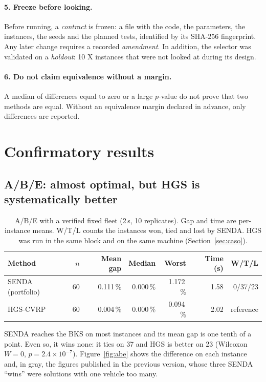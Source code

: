 \documentclass[11pt,a4paper]{article}
\newcommand{\senda}{SENDA}
\begin{document}
\paragraph{5. Freeze before looking.} Before running, a \emph{contract} is frozen: a file with the
code, the parameters, the instances, the seeds and the planned tests, identified by its SHA-256
fingerprint. Any later change requires a recorded \emph{amendment}. In addition, the selector was
validated on a \emph{holdout}: 10 X instances that were not looked at during its design.

\paragraph{6. Do not claim equivalence without a margin.} A median of differences equal to zero or a
large $p$-value do not prove that two methods are equal. Without an equivalence margin declared in
advance, only differences are reported.

\section{Confirmatory results}
\label{sec:resultados}

\subsection{A/B/E: almost optimal, but HGS is systematically better}

\begin{table}[H]
\centering
\caption{A/B/E with a verified fixed fleet (2\,s, 10 replicates). Gap and time are per-instance
means. W/T/L counts the instances won, tied and lost by SENDA. HGS was run in the same block and on
the same machine (Section~\ref{sec:caso}).}
\label{tab:abe}
\small
\begin{tabular}{@{}lrrrrrr@{}}
\toprule
Method & $n$ & Mean gap & Median & Worst & Time (s) & W/T/L \\
\midrule
\senda{} (portfolio) & 60 & 0.111\,\% & 0.000\,\% & 1.172\,\% & 1.58 & 0/37/23 \\
HGS-CVRP        & 60 & 0.004\,\% & 0.000\,\% & 0.094\,\% & 2.02 & reference \\
\bottomrule
\end{tabular}
\end{table}

SENDA reaches the BKS on most instances and its mean gap is one tenth of a point. Even so, it wins
none: it ties on 37 and HGS is better on 23 (Wilcoxon $W=0$, $p=2.4\times10^{-7}$).
Figure~\ref{fig:abe} shows the difference on each instance and, in gray, the figures published in the
previous version, whose three SENDA ``wins'' were solutions with one vehicle too many.
\end{document}
